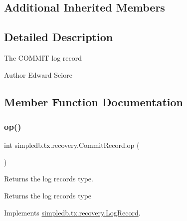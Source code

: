 \subsection*{Additional Inherited Members}


\subsection{Detailed Description}
The C\+O\+M\+M\+IT log record \begin{DoxyAuthor}{Author}
Edward Sciore 
\end{DoxyAuthor}


\subsection{Member Function Documentation}
\mbox{\label{classsimpledb_1_1tx_1_1recovery_1_1CommitRecord_a4a550ab6247f33e349b3edff767bc630}} 
\subsubsection{\texorpdfstring{op()}{op()}}
{\footnotesize\ttfamily int simpledb.\+tx.\+recovery.\+Commit\+Record.\+op (\begin{DoxyParamCaption}{ }\end{DoxyParamCaption})\hspace{0.3cm}{\ttfamily [inline]}}

Returns the log record\textquotesingle{}s type. \begin{DoxyReturn}{Returns}
the log record\textquotesingle{}s type 
\end{DoxyReturn}


Implements \hyperlink{interfacesimpledb_1_1tx_1_1recovery_1_1LogRecord_aa97a8907de4709c2b3596e8c9709a26c}{simpledb.\+tx.\+recovery.\+Log\+Record}.

\mbox{\label{classsimpledb_1_1tx_1_1recovery_1_1CommitRecord_a9e644845f0e04b1c9c0fae4d9cdbe618}} 
